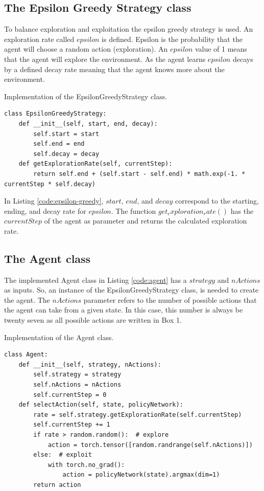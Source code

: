 \documentclass[12pt,oneside]{article}
\begin{document}
\subsection{The Epsilon Greedy Strategy class}
To balance exploration and exploitation the epsilon greedy strategy is used. An exploration rate called $epsilon$ is defined. Epsilon is the probability that the agent will choose a random action (exploration). An $epsilon$ value of 1 means that the agent will explore the environment. As the agent learns $epsilon$ decays by a defined decay rate meaning that the agent knows more about the environment.
\begin{listing}[H]
\caption{Implementation of the EpsilonGreedyStrategy class.}
\label{code:epsilon-greedy}
\begin{tcolorbox}[]
\begin{verbatim}
class EpsilonGreedyStrategy:
    def __init__(self, start, end, decay):
        self.start = start
        self.end = end
        self.decay = decay
    def getExplorationRate(self, currentStep):
        return self.end + (self.start - self.end) * math.exp(-1. * currentStep * self.decay)
\end{verbatim}
\end{tcolorbox}
\end{listing} 
In Listing \ref{code:epsilon-greedy}, $start$, $end$, and $decay$ correspond to the starting, ending, and decay rate for $epsilon$. The function $get_exploration_rate()$ has the $currentStep$ of the agent as parameter and returns the calculated exploration rate.

\subsection{The Agent class}
The implemented Agent class in Listing \ref{code:agent} has a $strategy$ and $nActions$ as inputs. So, an instance of the EpsilonGreedyStrategy class, is needed to create the agent. The $nActions$ parameter refers to the number of possible actions that the agent can take from a given state. In this case, this number is always be twenty seven as all possible actions are written in Box 1.

\begin{listing}[H]
\caption{Implementation of the Agent class.}
\label{code:agent}
\begin{tcolorbox}[]
\begin{verbatim}
class Agent:
    def __init__(self, strategy, nActions):
        self.strategy = strategy
        self.nActions = nActions
        self.currentStep = 0
    def selectAction(self, state, policyNetwork):
        rate = self.strategy.getExplorationRate(self.currentStep)
        self.currentStep += 1
        if rate > random.random():  # explore
            action = torch.tensor([random.randrange(self.nActions)])
        else:  # exploit
        	with torch.no_grad():
            	action = policyNetwork(state).argmax(dim=1)
        return action
\end{verbatim}
\end{tcolorbox}
\end{listing} 
\end{document}
